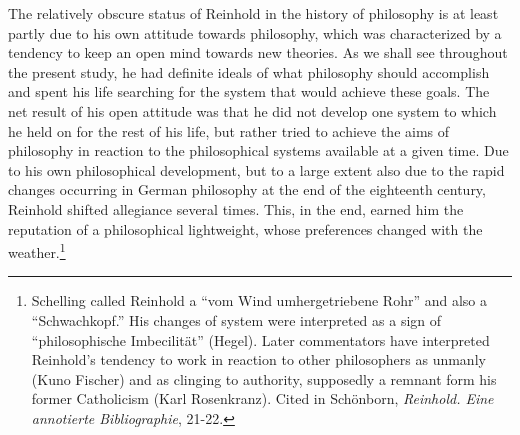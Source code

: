 The relatively obscure status of Reinhold in the history of philosophy is at least partly due to his own attitude towards philosophy, which was characterized by a tendency to keep an open mind towards new theories. As we shall see throughout the present study, he had definite ideals of what philosophy should accomplish and spent his life searching for the system that would achieve these goals. The net result of his open attitude was that he did not develop one system to which he held on for the rest of his life, but rather tried to achieve the aims of philosophy in reaction to the philosophical systems available at a given time. Due to his own philosophical development, but to a large extent also due to the rapid changes occurring in German philosophy at the end of the eighteenth century, Reinhold shifted allegiance several times. This, in the end, earned him the reputation of a philosophical lightweight, whose preferences changed with the weather.\footnote{ Schelling called Reinhold a ``vom Wind umhergetriebene Rohr'' and also a ``Schwachkopf.'' His changes of system were interpreted as a sign of ``philosophische Imbecilit\"{a}t'' (Hegel). Later commentators have interpreted Reinhold's tendency to work in reaction to other philosophers as unmanly (Kuno Fischer) and as clinging to authority, supposedly a remnant form his former Catholicism (Karl Rosenkranz). Cited in Sch\"{o}nborn, \textit{Reinhold. Eine annotierte Bibliographie}, 21{-}22.} 

